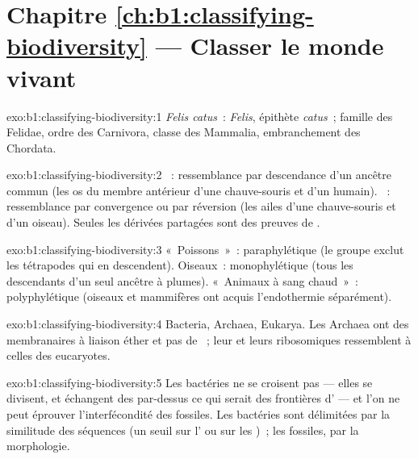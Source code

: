 \section*{Chapitre \ref{ch:b1:classifying-biodiversity} --- Classer le monde vivant}

\begin{solution}{exo:b1:classifying-biodiversity:1}
\emph{Felis catus}~:  \emph{Felis}, épithète \emph{catus}~; famille
des Felidae, ordre des Carnivora, classe des Mammalia, embranchement
des Chordata.
\end{solution}

\begin{solution}{exo:b1:classifying-biodiversity:2}
~: ressemblance par descendance d'un ancêtre commun (les os du
membre antérieur d'une chauve-souris et d'un humain). ~:
ressemblance par convergence ou par réversion (les ailes d'une
chauve-souris et d'un oiseau). Seules les  dérivées partagées
sont des preuves de .
\end{solution}

\begin{solution}{exo:b1:classifying-biodiversity:3}
«~Poissons~»~: paraphylétique (le groupe exclut les tétrapodes qui en
descendent). Oiseaux~: monophylétique (tous les descendants d'un seul
ancêtre à plumes). «~Animaux à sang chaud~»~: polyphylétique (oiseaux et
mammifères ont acquis l'endothermie séparément).
\end{solution}

\begin{solution}{exo:b1:classifying-biodiversity:4}
Bacteria, Archaea, Eukarya. Les Archaea ont des  membranaires à
liaison éther et pas de ~; leur  et leurs
 ribosomiques ressemblent à celles des eucaryotes.
\end{solution}

\begin{solution}{exo:b1:classifying-biodiversity:5}
Les bactéries ne se croisent pas --- elles se divisent, et échangent des
 par-dessus ce qui serait des frontières d' --- et l'on ne
peut éprouver l'interfécondité des fossiles. Les bactéries sont
délimitées par la similitude des séquences (un seuil sur l' ou sur les )~; les fossiles, par la morphologie.
\end{solution}

